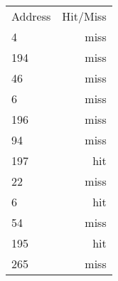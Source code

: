 \documentclass{article}
\begin{document}
\subsection{}

\begin{tabular}{l | r }
  \hline
  Address & Hit/Miss\\
  4 &  miss \\
  194 &  miss \\
  46 &  miss \\
  6 & miss \\
  196 & miss \\
  94 & miss \\
  197 & hit \\
  22 & miss \\
  6 & hit \\
  54 & miss \\
  195 & hit \\
  265 & miss \\
  \hline  
\end{tabular}
\end{document}
